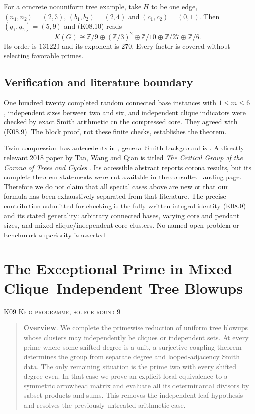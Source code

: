 \documentclass[11pt,a4paper]{article}
\theoremstyle{definition}\newtheorem{definition}[theorem]{Definition}
\theoremstyle{remark}\newtheorem{remark}[theorem]{Remark}
\newcommand{\Z}{\mathbb Z}\newcommand{\Q}{\mathbb Q}\newcommand{\F}{\mathbb F}
\numberwithin{equation}{section}
\begin{document}
For a concrete nonuniform tree example, take $H$ to be one edge, $(n_1,n_2)=(2,3)$, $(b_1,b_2)=(2,4)$ and $(c_1,c_2)=(0,1)$. Then $(q_1,q_2)=(5,9)$ and (K08.10) reads
\[
 K(G)\cong \Z/9\oplus(\Z/3)^2\oplus\Z/10\oplus\Z/27
               \oplus\Z/6.
\]
Its order is $131220$ and its exponent is $270$. Every factor is covered without selecting favorable primes.

\subsection{Verification and literature boundary}\label{K08-sec-5}
One hundred twenty completed random connected base instances with $1\leq m\leq6$, independent sizes between two and six, and independent clique indicators were checked by exact Smith arithmetic on the compressed core. They agreed with (K08.9). The block proof, not these finite checks, establishes the theorem.

Twin compression has antecedents in \cite{ref028,ref029}; general Smith background is \cite{ref030}. A directly relevant 2018 paper by Tan, Wang and Qian is titled \emph{The Critical Group of the Corona of Trees and Cycles} \cite{ref034}. Its accessible abstract reports corona results, but its complete theorem statements were not available in the consulted landing page. Therefore we do not claim that all special cases above are new or that our formula has been exhaustively separated from that literature. The precise contribution submitted for checking is the fully written integral identity (K08.9) and its stated generality: arbitrary connected bases, varying core and pendant sizes, and mixed clique/independent core clusters. No named open problem or benchmark superiority is asserted.




\clearpage
\section[K09 --- The Exceptional Prime in Mixed Clique--Independent Tree Blowups]{The Exceptional Prime in Mixed Clique--Independent Tree Blowups}\label{contrib-K09}
\noindent\textsc{K09 \quad Keio programme, source round 9}\par\medskip


\begin{quote}\small\textbf{Overview.} We complete the primewise reduction of uniform tree blowups whose clusters may independently be cliques or independent sets. At every prime where some shifted degree is a unit, a surjective-coupling theorem determines the group from separate degree and looped-adjacency Smith data. The only remaining situation is the prime two with every shifted degree even. In that case we prove an explicit local equivalence to a symmetric arrowhead matrix and evaluate all its determinantal divisors by subset products and sums. This removes the independent-leaf hypothesis and resolves the previously untreated arithmetic case.\end{quote}
\end{document}

